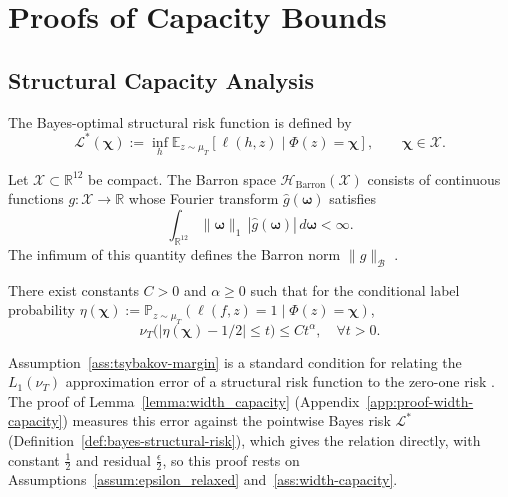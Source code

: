 \section{Proofs of Capacity Bounds}
\label{app:capacity-results}

\subsection{Structural Capacity Analysis}
\label{app:structural-capacity}

\begin{definition} \label{def:bayes-structural-risk} The Bayes-optimal structural risk function is defined by \begin{equation} \mathcal{L}^*(\boldsymbol{\chi}) := \inf_{h} \mathbb{E}_{z \sim \mu_T}\!\left[\ell(h,z)\mid \Phi(z)=\boldsymbol{\chi}\right], \qquad \boldsymbol{\chi}\in\mathcal{X}. \end{equation} \end{definition} \begin{definition} \label{def:barron-space} Let $\mathcal{X}\subset\mathbb{R}^{12}$ be compact. The Barron space $\mathcal{H}_{\mathrm{Barron}}(\mathcal{X})$ consists of continuous functions $g:\mathcal{X}\to\mathbb{R}$ whose Fourier transform $\hat g(\boldsymbol{\omega})$ satisfies \begin{equation} \int_{\mathbb{R}^{12}} \|\boldsymbol{\omega}\|_1 \,|\hat g(\boldsymbol{\omega})| \,d\boldsymbol{\omega} <\infty. \end{equation} The infimum of this quantity defines the Barron norm $\|g\|_{\mathcal{B}}$ \citep{Barron1993}. \end{definition}
\begin{assumption}
\label{ass:tsybakov-margin}
There exist constants $C > 0$ and $\alpha \ge 0$ such that for the conditional label probability 
$\eta(\boldsymbol{\chi}) := \mathbb{P}_{z\sim\mu_T}(\ell(f,z)=1 \mid \Phi(z)=\boldsymbol{\chi})$,
\[
\nu_T\big(|\eta(\boldsymbol{\chi}) - 1/2| \le t\big) 
\le C t^\alpha, \quad \forall t > 0.
\]
\end{assumption}
Assumption~\ref{ass:tsybakov-margin} is a standard condition for relating the $L_1(\nu_T)$ approximation error of a structural risk function to the zero-one risk \citep{tsybakov2004optimal}. The proof of Lemma~\ref{lemma:width_capacity} (Appendix~\ref{app:proof-width-capacity}) measures this error against the pointwise Bayes risk $\mathcal{L}^*$ (Definition~\ref{def:bayes-structural-risk}), which gives the relation directly, with constant $\frac12$ and residual $\frac{\epsilon}{2}$, so this proof rests on Assumptions~\ref{assum:epsilon_relaxed} and~\ref{ass:width-capacity}.

